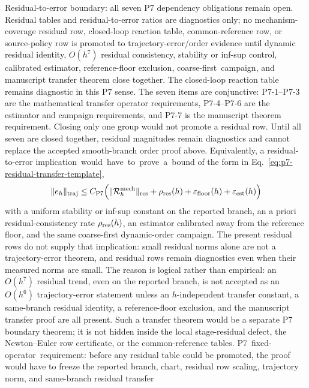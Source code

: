 \documentclass[preprint,12pt]{elsarticle}
\begin{document}
Residual-to-error boundary: all
seven P7 dependency obligations remain open. Residual tables and
residual-to-error ratios are diagnostics only; no mechanism-coverage residual
row, closed-loop reaction table, common-reference row, or source-policy row is
promoted to trajectory-error/order evidence until dynamic residual identity,
\(O(h^7)\) residual consistency, stability or inf-sup control, calibrated
estimator, reference-floor exclusion, \mbox{coarse-first campaign}, and manuscript
transfer theorem close together.
The closed-loop reaction table remains diagnostic in this P7 sense.
The seven items are conjunctive: P7-1--P7-3 are the mathematical transfer
operator requirements, P7-4--P7-6 are the estimator and campaign requirements,
and P7-7 is the manuscript theorem requirement. Closing only one group would
not promote a residual row.
Until all seven are closed together, residual magnitudes remain diagnostics
and cannot replace the accepted smooth-branch order proof above.
Equivalently, a residual-to-error \mbox{implication would have to prove a bound} of
the form in Eq.~\eqref{eq:p7-residual-transfer-template},
\begin{equation}
\label{eq:p7-residual-transfer-template}
  \|e_h\|_{\rm traj}
  \le C_{\rm P7}\Bigl(
     \|\mathcal R_h^{\rm mech}\|_{\rm res}
     +\rho_{\rm res}(h)
     +\varepsilon_{\rm floor}(h)
     +\varepsilon_{\rm est}(h)
  \Bigr)
\end{equation}
with a uniform stability or inf-sup constant on the reported branch, an
a priori residual-consistency rate \(\rho_{\rm res}(h)\), an estimator
calibrated away from the reference floor, and the same coarse-first
dynamic-order campaign. The present residual rows do not supply that
implication: small residual norms alone are not a trajectory-error theorem,
and residual rows remain diagnostics even when their measured norms are small.
The reason is logical rather than empirical:
an \(O(h^7)\) residual trend, even on the reported branch, is not accepted as
an \(O(h^6)\) trajectory-error statement unless an \(h\)-independent transfer
constant, a same-branch residual identity, a reference-floor exclusion, and
the manuscript transfer proof are all present. Such a transfer theorem would
be a separate P7 boundary theorem; it is not hidden inside the local stage-residual
defect, the Newton--Euler row certificate, or the common-reference tables.
\mbox{P7 fixed-operator requirement}: before any residual table could
be promoted, the proof would have to freeze the reported branch, chart,
residual row scaling, trajectory norm, and same-branch residual transfer
\end{document}
